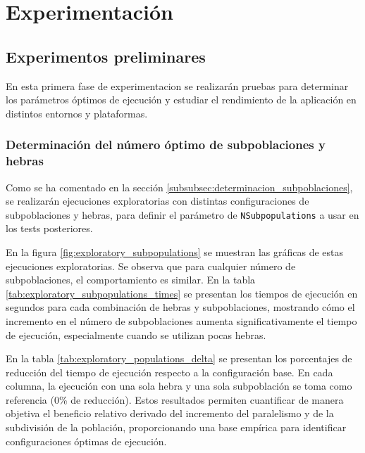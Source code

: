 \chapter{Experimentación}\label{cap:experimentacion}

\section{Experimentos preliminares}

En esta primera fase de experimentacion se realizarán pruebas para determinar los parámetros óptimos de ejecución y estudiar el rendimiento de la aplicación en distintos entornos y plataformas.

\subsection{Determinación del número óptimo de subpoblaciones y hebras}

Como se ha comentado en la sección \ref{subsubsec:determinacion_subpoblaciones}, se realizarán ejecuciones exploratorias con distintas configuraciones de subpoblaciones y hebras, para definir el parámetro de \texttt{NSubpopulations} a usar en los tests posteriores.

En la figura \ref{fig:exploratory_subpopulations} se muestran las gráficas de estas ejecuciones exploratorias. Se observa que para cualquier número de subpoblaciones, el comportamiento es similar. En la tabla \ref{tab:exploratory_subpopulations_times} se presentan los tiempos de ejecución en segundos para cada combinación de hebras y subpoblaciones, mostrando cómo el incremento en el número de subpoblaciones aumenta significativamente el tiempo de ejecución, especialmente cuando se utilizan pocas hebras.

En la tabla \ref{tab:exploratory_populations_delta} se presentan los porcentajes de reducción del tiempo de ejecución respecto a la configuración base. En cada columna, la ejecución con una sola hebra y una sola subpoblación se toma como referencia (0\% de reducción). Estos resultados permiten cuantificar de manera objetiva el beneficio relativo derivado del incremento del paralelismo y de la subdivisión de la población, proporcionando una base empírica para identificar configuraciones óptimas de ejecución.

